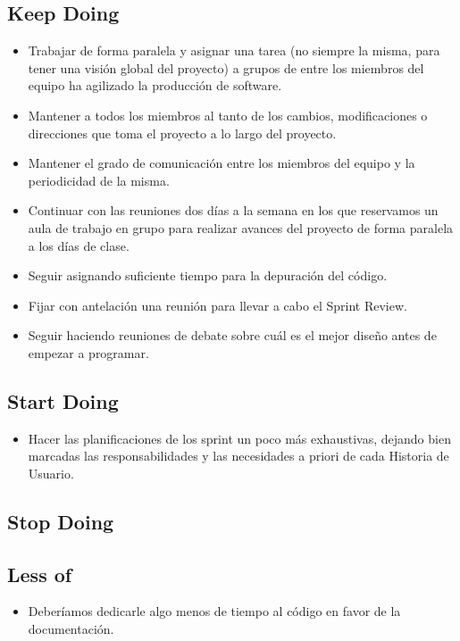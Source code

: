 \documentclass{article}
\begin{document}
\subsection{Keep Doing}
\begin{itemize}
\item Trabajar de forma paralela y asignar una tarea (no siempre la misma, para tener una visión global del proyecto) a grupos de entre los miembros del equipo ha agilizado la producción de software.

\item Mantener a todos los miembros al tanto de los cambios, modificaciones o direcciones que toma el proyecto a lo largo del proyecto.

\item Mantener el grado de comunicación entre los miembros del equipo y la periodicidad de la misma.

\item Continuar con las reuniones dos días a la semana en los que reservamos un aula de trabajo en grupo para realizar avances del proyecto de forma paralela a los días de clase.

\item Seguir asignando suficiente tiempo para la depuración del código.

\item Fijar con antelación una reunión para llevar a cabo el Sprint Review.

\item Seguir haciendo reuniones de debate sobre cuál es el mejor diseño antes de empezar a programar.
\end{itemize}

\subsection{Start Doing}
\begin{itemize}
\item Hacer las planificaciones de los sprint un poco más exhaustivas, dejando bien marcadas las responsabilidades y las necesidades a priori de cada Historia de Usuario.
\end{itemize}

\subsection{Stop Doing}


\subsection{Less of}
\begin{itemize}
\item Deberíamos dedicarle algo menos de tiempo al código en favor de la documentación.
\end{itemize}
\end{document}
